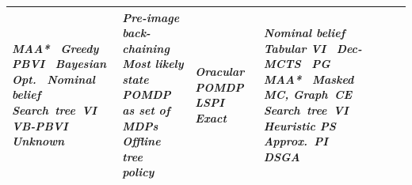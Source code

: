 \documentclass[journal]{IEEEtran}
\begin{document}
\begin{table}[!t]
\begin{tabularx}{\textwidth}{LLLLLLL}
    \textit{MAA*~}\cite{szer2005maastar,lauri2017multi}\newline
    \textit{Greedy PBVI~}\cite{satsangi2018exploiting}\newline
    \textit{Bayesian Opt.~}\cite{martinez2009bayesian}\newline
    \textit{Nominal belief~}\cite{miller2009pomdp}\newline
    \textit{Search~tree~VI~}\cite{yi2019indoor}\newline
    \textit{VB-PBVI~}\cite{burks2019optimal}\newline
    \textit{Unknown~}\cite{foka2003predictive}
    &
    \textit{Pre-image back-chaining}~\cite{kaelbling2017pre,kaelbling2013integrated}\newline
    \textit{Most likely state~}\cite{hsiao2008robust}\newline
    \textit{POMDP as set of MDPs~}\cite{chen2016pomdp}\newline
    \textit{Offline tree policy~}\cite{zhou2017probabilistic}
    &
    \textit{Oracular POMDP}~\cite{armstrong2007oracular,rosenthal2011modeling}\newline
    \textit{LSPI~}\cite{lagoudakis2003least,wang2017anticipatory}\newline
    \textit{Exact~}\cite{pineau2003towards}
    &
    \textit{Nominal belief~}\cite{miller2009pomdp,ragi2014decentralized}\newline
    \textit{Tabular VI~}\cite{bellman1966dynamic,matignon2012coordinated}\newline
    \textit{Dec-MCTS~}\cite{best2019dec,sukkar2019multi}\newline
    \textit{PG~}\cite{buffet2009factored,zhang2013active}\newline
    \textit{MAA*~}\cite{szer2005maastar,lauri2017multi}\newline
    \textit{Masked MC, Graph~CE~}\cite{omidshafiei2017decentralized}\newline
    \textit{Search~tree~VI~}\cite{yi2019indoor}\newline
    \textit{Heuristic PS~}\cite{amato2016policy}\newline
    \textit{Approx.~PI~}\cite{bhattacharya2020multiagent}\newline
    \textit{DSGA~}\cite{corah2019distributed}
    \\
\bottomrule
\end{tabularx}
\end{table}
\end{document}
